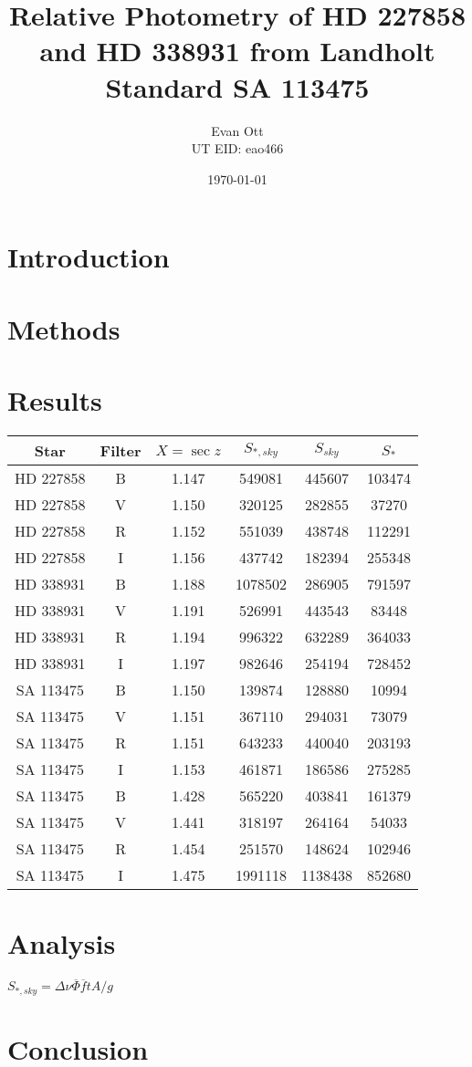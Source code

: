 \documentclass{article}
\title{Relative Photometry of HD 227858 and HD 338931 from Landholt Standard SA 113475}
\author{Evan Ott \\ UT EID: eao466}
\date{\today}
\newcommand{\obar}[1]{\ensuremath{\overline{ #1 }}}
\begin{document}
\maketitle
\section{Introduction}





\section{Methods}








\section{Results}


\begin{tabular}{c | c | c | c | c | c}
Star & Filter & $X=\sec{z}$ & $S_{*,sky}$ & $S_{sky}$ & $S_*$\\
\hline
HD 227858 & B & 1.147 & 549081 & 445607 & 103474\\
HD 227858 & V & 1.150 & 320125 & 282855 & 37270\\
HD 227858 & R & 1.152 & 551039 & 438748 & 112291\\
HD 227858 & I & 1.156 & 437742 &  182394 & 255348\\
HD 338931 & B & 1.188 & 1078502 & 286905 & 791597\\
HD 338931 & V & 1.191 & 526991 & 443543 & 83448\\
HD 338931 & R & 1.194 & 996322 & 632289 & 364033\\
HD 338931 & I & 1.197 & 982646 & 254194 & 728452\\
SA 113475 & B & 1.150 & 139874 & 128880 & 10994\\
SA 113475 & V & 1.151 & 367110 & 294031 & 73079\\
SA 113475 & R & 1.151 & 643233 & 440040 & 203193\\
SA 113475 & I & 1.153 & 461871 & 186586 & 275285\\
SA 113475 & B & 1.428 & 565220 & 403841 & 161379\\
SA 113475 & V & 1.441 & 318197 & 264164 & 54033\\
SA 113475 & R & 1.454 & 251570 & 148624 & 102946\\
SA 113475 & I & 1.475 & 1991118 & 1138438 & 852680\\
\end{tabular}

\section{Analysis}
$S_{*,sky}=\Delta\nu{\obar{\Phi}}{\obar{f}}tA/g$





\section{Conclusion}






\begin{thebibliography}{9}

\end{thebibliography}
\end{document}
